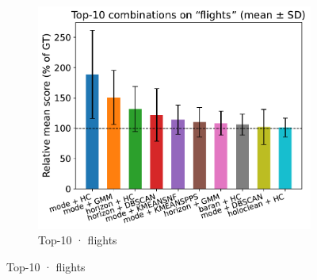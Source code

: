\documentclass[10pt]{article} %
\numberwithin{equation}{section}
\begin{document}
\begin{figure}[htbp]
\begin{subfigure}{0.32\linewidth}
    \centering
    \includegraphics[width=\linewidth]{figures/5.3.1graph/top10_bar_error_flights.pdf}
    \caption{Top-10 · flights}
  \end{subfigure}


\end{figure}
\end{document}
